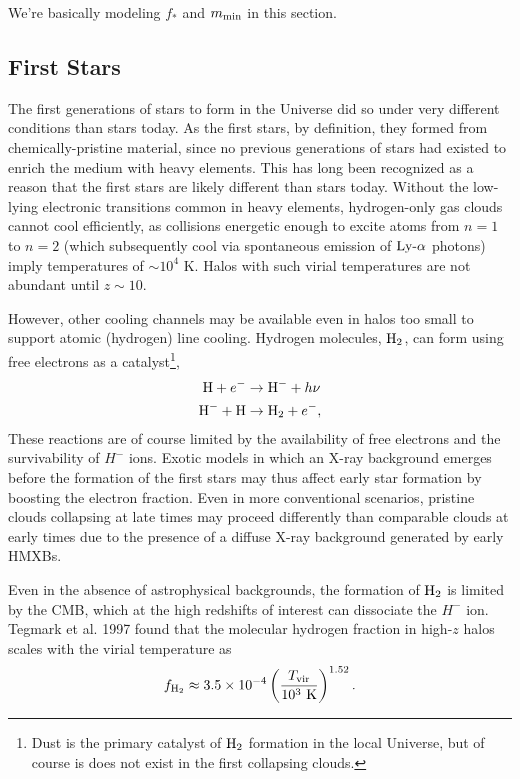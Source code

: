 {\color{red} We're basically modeling $f_{\ast}$ and $m_{\text{min}}$ in this section.}


\subsection{First Stars} \label{sec:firststars}
The first generations of stars to form in the Universe did so under very different conditions than stars today. As the first stars, by definition, they formed from chemically-pristine material, since no previous generations of stars had existed to enrich the medium with heavy elements. This has long been recognized as a reason that the first stars are likely different than stars today. Without the low-lying electronic transitions common in heavy elements, hydrogen-only gas clouds cannot cool efficiently, as collisions energetic enough to excite atoms from $n=1$ to $n=2$ (which subsequently cool via spontaneous emission of $\text{Ly-}\alpha$ photons) imply temperatures of $\sim 10^4$ K. Halos with such virial temperatures are not abundant until $z \sim 10$.

However, other cooling channels may be available even in halos too small to support atomic (hydrogen) line cooling. Hydrogen molecules, $\text{H}_2$, can form using free electrons as a catalyst\footnote{Dust is the primary catalyst of $\text{H}_2$ formation in the local Universe, but of course is does not exist in the first collapsing clouds.}, 
\begin{align}
	\text{H} + e^- & \rightarrow \text{H}^- + h\nu \\
	\text{H}^- + \text{H} & \rightarrow \text{H}_2 + e^- ,
\end{align}
These reactions are of course limited by the availability of free electrons and the survivability of $H^-$ ions. Exotic models in which an X-ray background emerges before the formation of the first stars may thus affect early star formation by boosting the electron fraction. Even in more conventional scenarios, pristine clouds collapsing at late times may proceed differently than comparable clouds at early times due to the presence of a diffuse X-ray background generated by early HMXBs. 

Even in the absence of astrophysical backgrounds, the formation of $\text{H}_2$ is limited by the CMB, which at the high redshifts of interest can dissociate the $H^-$ ion. Tegmark et al. 1997 found that the molecular hydrogen fraction in high-$z$ halos scales with the virial temperature as
\begin{equation}
	f_{\text{H}_2} \approx 3.5 \times 10^{-4} \left(\frac{T_{\text{vir}}}{10^3 \ \mathrm{K}} \right)^{1.52} .
\end{equation}



